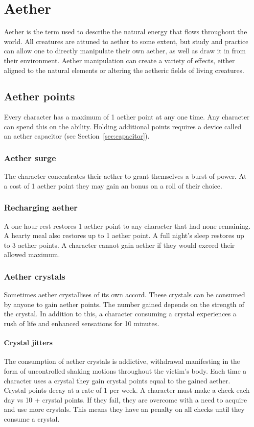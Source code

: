 \documentclass[a4paper,11pt,oneside]{book}
\newcommand{\textlf}[1]{\textbf{\titlecap{#1}}}
\begin{document}
\chapter{Aether}
Aether is the term used to describe the natural energy that flows throughout the world. All creatures are attuned to aether to some extent, but study and practice can allow one to directly manipulate their own aether, as well as draw it in from their environment. Aether manipulation can create a variety of effects, either aligned to the natural elements or altering the aetheric fields of living creatures.

\section{Aether points}
Every character has a maximum of 1 aether point at any one time. Any character can spend this on the \textlf{aether surge} ability. Holding additional points requires a device called an aether capacitor (see Section~\ref{sec:capacitor}).

\subsection{Aether surge}
The character concentrates their aether to grant themselves a burst of power. At a cost of 1 aether point they may gain an \textlf{edge} bonus on a roll of their choice.

\subsection{Recharging aether}
A one hour rest restores 1 aether point to any character that had none remaining. A hearty meal also restores up to 1 aether point. A full night's sleep restores up to 3 aether points. A character cannot gain aether if they would exceed their allowed maximum.

\subsection{Aether crystals}
Sometimes aether crystallises of its own accord. These crystals can be consumed by anyone to gain aether points. The number gained depends on the strength of the crystal. In addition to this, a character consuming a crystal experiences a rush of life and enhanced sensations for 10 minutes.
\subsubsection{Crystal jitters}
The consumption of aether crystals is addictive, withdrawal manifesting in the form of uncontrolled shaking motions throughout the victim's body. Each time a character uses a crystal they gain crystal points equal to the gained aether. Crystal points decay at a rate of 1 per week. A character must make a \textlf{resolve} check each day vs 10 + crystal points. If they fail, they are overcome with a need to acquire and use more crystals. This means they have an \textlf{edge} penalty on all checks until they consume a crystal.   
\end{document}

